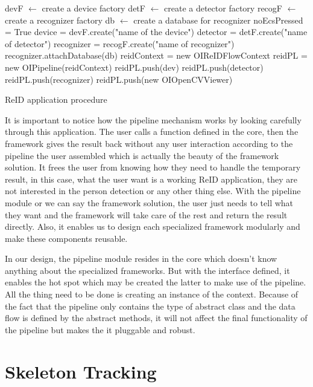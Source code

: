 \begin{algorithm}
    devF $\leftarrow$ create a device factory\;
    detF $\leftarrow$ create a detector factory\;
    recogF $\leftarrow$ create a recognizer factory\;
    db $\leftarrow$ create a database for recognizer\;
    \;
    noEcsPressed = True\;
    device = devF.create("name of the device")\;
    detector = detF.create("name of detector")\;
    recognizer = recogF.create("name of recognizer")\;
     recognizer.attachDatabase(db)\;
    \;
    reidContext = new OIReIDFlowContext \;
    reidPL = new OIPipeline(reidContext) \;
    reidPL.push(dev)\;
    reidPL.push(detector)\;
    reidPL.push(recognizer)\;
    reidPL.push(new OIOpenCVViewer)\;
    \;
    \caption{ReID application procedure}
    \label{algo:fw-app-reid}
\end{algorithm}

It is important to notice how the pipeline mechanism works by looking carefully
through this application. The user calls a function defined in the core, then
the framework gives the result back without any user interaction according to the
pipeline the user assembled which is actually the beauty of the framework
solution.
It frees the user from knowing how they need to handle the temporary result, in
this case, what the user want is a working ReID application, they are not
interested in the person detection or any other thing else. With the pipeline
module or we can say the framework solution, the user just needs to tell what
they want and the framework will take care of the rest and return the result
directly. Also, it enables us to design each specialized framework modularly and
make these components reusable.

In our design, the pipeline module resides in the core which doesn't know
anything about the specialized frameworks. But with the interface defined,
it enables the hot spot which may be created the latter to make use of the pipeline.
All the thing need to be done is creating an instance of the context.
Because of the fact that the pipeline only contains the type of abstract
class and the data flow is defined by the abstract methods, it will not affect
the final functionality of the pipeline but makes the it pluggable and robust.

\section{Skeleton Tracking}
\label{sec:fw-app-skt}

